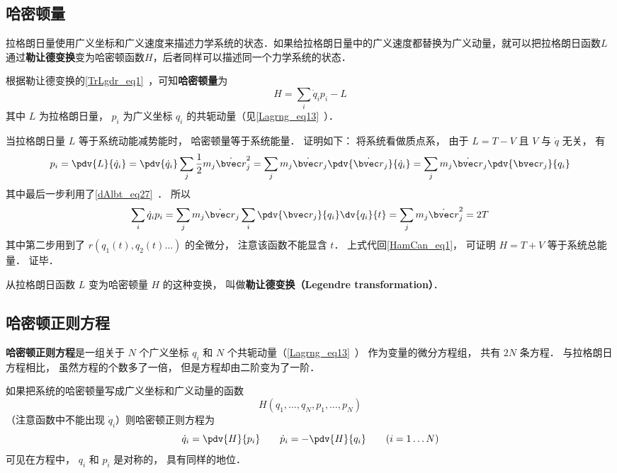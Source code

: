 

\subsection{哈密顿量}
拉格朗日量使用广义坐标和广义速度来描述力学系统的状态．如果给拉格朗日量中的广义速度都替换为广义动量，就可以把拉格朗日函数$L$通过\textbf{勒让德变换}变为哈密顿函数$H$，后者同样可以描述同一个力学系统的状态．

根据勒让德变换的\autoref{TrLgdr_eq1}~，可知\textbf{哈密顿量}为
\begin{equation}\label{HamCan_eq1}
H = \sum_i \dot q_i p_i - L
\end{equation}
其中 $L$ 为拉格朗日量， $p_i$ 为广义坐标 $q_i$ 的共轭动量（见\autoref{Lagrng_eq13}~）．

当拉格朗日量 $L$ 等于系统动能减势能时， 哈密顿量等于系统能量． 证明如下： 将系统看做质点系， 由于 $L = T - V$ 且 $V$ 与 $\dot q$ 无关， 有
\begin{equation}
p_i = \pdv{L}{\dot q_i} = \pdv{\dot q_i} \sum_j \frac12 m_j \dot{\bvec r}_j^2
= \sum_j m_j \dot{\bvec r}_j \pdv{\dot{\bvec r}_j}{\dot q_i}
= \sum_j m_j \dot{\bvec r}_j  \pdv{\bvec r_j}{q_i}
\end{equation}
其中最后一步利用了\autoref{dAlbt_eq27}~． 所以
\begin{equation}
 \sum_i \dot q_i p_i = \sum_j m_j \dot{\bvec r}_j \sum_i \pdv{\bvec r_j}{q_i}\dv{q_i}{t}
= \sum_j m_j \dot{\bvec r}_j^2 = 2T
\end{equation}
其中第二步用到了 $r(q_1(t), q_2(t) \dots)$ 的全微分， 注意该函数不能显含 $t$．%
上式代回\autoref{HamCan_eq1}， 可证明 $H = T + V$ 等于系统总能量． 证毕．

从拉格朗日函数 $L$ 变为哈密顿量 $H$ 的这种变换， 叫做\textbf{勒让德变换（Legendre transformation）}．

\subsection{哈密顿正则方程}
\textbf{哈密顿正则方程}是一组关于 $N$ 个广义坐标 $q_i$ 和 $N$ 个共轭动量（\autoref{Lagrng_eq13}~） 作为变量的微分方程组， 共有 $2N$ 条方程． 与拉格朗日方程相比， 虽然方程的个数多了一倍， 但是方程却由二阶变为了一阶．

如果把系统的哈密顿量写成广义坐标和广义动量的函数
\begin{equation}
H(q_1,\dots, q_N, p_1,\dots, p_N)
\end{equation}
（注意函数中不能出现 $\dot q_i$）则哈密顿正则方程为
\begin{equation}\label{HamCan_eq2}
\dot q_i = \pdv{H}{p_i}
\qquad
\dot p_i = -\pdv{H}{q_i}
\qquad
(i = 1\dots N)
\end{equation}
可见在方程中， $q_i$ 和 $p_i$ 是对称的， 具有同样的地位．

